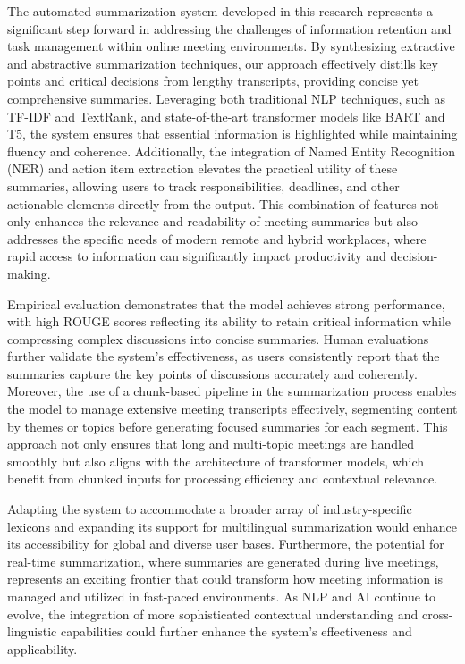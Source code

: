 \documentclass{article}
\begin{document}
The automated summarization system developed in this research represents a significant step forward in addressing the challenges of information retention and task management within online meeting environments. By synthesizing extractive and abstractive summarization techniques, our approach effectively distills key points and critical decisions from lengthy transcripts, providing concise yet comprehensive summaries. Leveraging both traditional NLP techniques, such as TF-IDF and TextRank, and state-of-the-art transformer models like BART and T5, the system ensures that essential information is highlighted while maintaining fluency and coherence. Additionally, the integration of Named Entity Recognition (NER) and action item extraction elevates the practical utility of these summaries, allowing users to track responsibilities, deadlines, and other actionable elements directly from the output. This combination of features not only enhances the relevance and readability of meeting summaries but also addresses the specific needs of modern remote and hybrid workplaces, where rapid access to information can significantly impact productivity and decision-making.

Empirical evaluation demonstrates that the model achieves strong performance, with high ROUGE scores reflecting its ability to retain critical information while compressing complex discussions into concise summaries. Human evaluations further validate the system’s effectiveness, as users consistently report that the summaries capture the key points of discussions accurately and coherently. Moreover, the use of a chunk-based pipeline in the summarization process enables the model to manage extensive meeting transcripts effectively, segmenting content by themes or topics before generating focused summaries for each segment. This approach not only ensures that long and multi-topic meetings are handled smoothly but also aligns with the architecture of transformer models, which benefit from chunked inputs for processing efficiency and contextual relevance.

Adapting the system to accommodate a broader array of industry-specific lexicons and expanding its support for multilingual summarization would enhance its accessibility for global and diverse user bases. Furthermore, the potential for real-time summarization, where summaries are generated during live meetings, represents an exciting frontier that could transform how meeting information is managed and utilized in fast-paced environments. As NLP and AI continue to evolve, the integration of more sophisticated contextual understanding and cross-linguistic capabilities could further enhance the system’s effectiveness and applicability.
\end{document}
